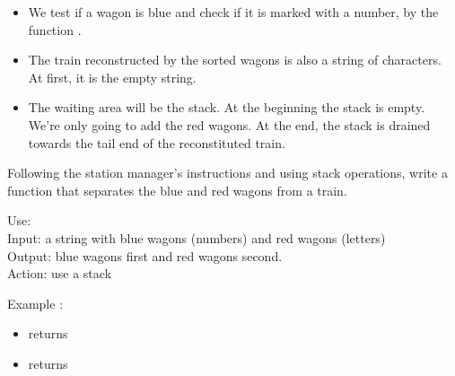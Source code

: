 \documentclass[11pt,class=report,crop=false]{standalone}
\begin{document}
\begin{activite}
\begin{itemize}
  \item We test if a wagon is blue and check if it is marked with a number, by the function .
  
  \item The train reconstructed by the sorted wagons is also a string of characters. At first, it is the empty string.
  
  \item The waiting area will be the stack. At the beginning the stack is empty. We're only going to add the red wagons. At the end, the stack is drained towards the tail end of the reconstituted train.
\end{itemize}


Following the station manager's instructions and using stack operations, write a  function that separates the blue and red wagons from a train.


\begin{fonction}
  Use:  \\
  Input: a string with blue wagons (numbers) and red wagons (letters) \\
  Output: blue wagons first and red wagons second.\\
  Action: use a stack
  
  \medskip
    
  Example : 
  \begin{itemize}
    \item {} returns 
    \item {} returns 
    \end{itemize}
    
\end{fonction}

\end{activite}

\end{document}
